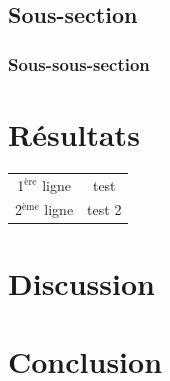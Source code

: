\documentclass[utf8]{article}
\begin{document}
\subsection{Sous-section}

\subsubsection{Sous-sous-section}

\section{Résultats}

\begin{center}
\begin{tabular}{|c|c|}
\hline
1$^{\text{ère}}$ ligne & test \\
2$^{\text{ème}}$ ligne & test 2 \\
\hline
\end{tabular}
\end{center}

\section{Discussion}

\section{Conclusion}
\end{document}
